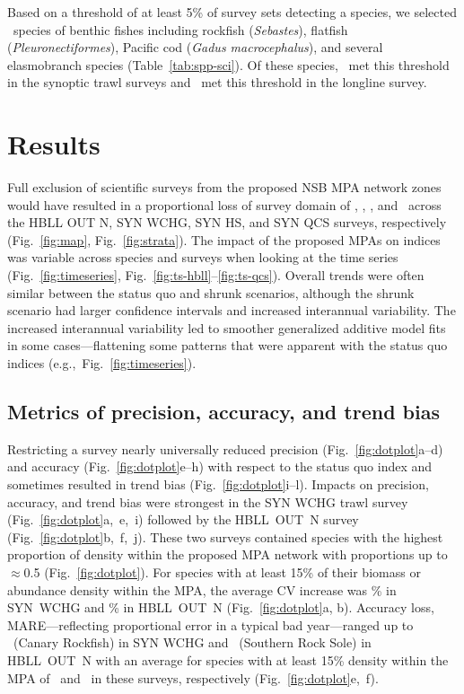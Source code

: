 \documentclass[12pt]{article}
\begin{document}
Based on a threshold of at least 5\% of survey sets detecting a species, we selected \nSpp\ species of benthic fishes including rockfish (\textit{Sebastes}), flatfish (\textit{Pleuronectiformes}), Pacific cod (\textit{Gadus macrocephalus}), and several elasmobranch species (Table~\ref{tab:spp-sci}). Of these species, \synNSpp\ met this threshold in the synoptic trawl surveys and \hbllNSpp\ met this threshold in the longline survey.

\section*{Results}

Full exclusion of scientific surveys from the proposed NSB MPA network zones would have resulted in a proportional loss of survey domain of \lostHBLL, \lostWCHG, \lostHS, and \lostQCS\ across the HBLL OUT N, SYN WCHG, SYN HS, and SYN QCS surveys, respectively (Fig.~\ref{fig:map}, Fig.~\ref{fig:strata}).
The impact of the proposed MPAs on indices was variable across species and surveys when looking at the time series (Fig.~\ref{fig:timeseries}, Fig.~\ref{fig:ts-hbll}--\ref{fig:ts-qcs}).
Overall trends were often similar between the status quo and shrunk scenarios, although the shrunk scenario had larger confidence intervals and increased interannual variability.
The increased interannual variability led to smoother generalized additive model fits in some cases---flattening some patterns that were apparent with the status quo indices (e.g.,~Fig.~\ref{fig:timeseries}).

\subsection*{Metrics of precision, accuracy, and trend bias}

Restricting a survey nearly universally reduced precision (Fig.~\ref{fig:dotplot}a--d) and accuracy (Fig.~\ref{fig:dotplot}e--h) with respect to the status quo index and sometimes resulted in trend bias (Fig.~\ref{fig:dotplot}i--l).
Impacts on precision, accuracy, and trend bias were strongest in the SYN WCHG trawl survey (Fig.~\ref{fig:dotplot}a,~e,~i) followed by the HBLL~OUT~N survey (Fig.~\ref{fig:dotplot}b,~f,~j).
These two surveys contained species with the highest proportion of density within the proposed MPA network with proportions up to $\approx$0.5 (Fig.~\ref{fig:dotplot}).
For species with at least 15\% of their biomass or abundance density within the MPA, the average CV increase was \precisionWCHGshrunk\% in SYN~WCHG and \precisionHBLLshrunk\% in HBLL~OUT~N (Fig.~\ref{fig:dotplot}a, b).
Accuracy loss, MARE---reflecting proportional error in a typical bad year---ranged up to \canaryrockfishSYNWCHGslopere\ (Canary Rockfish) in SYN WCHG and \southernrocksoleHBLLslopere\ (Southern Rock Sole) in HBLL~OUT~N with an average for species with at least 15\% density within the MPA of \accuracyWCHGshrunk\ and \accuracyHBLLshrunk\ in these surveys, respectively (Fig.~\ref{fig:dotplot}e,~f).
\end{document}
